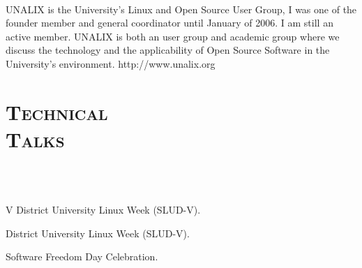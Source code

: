 \begin{resume}
\begin{formatb}
  \body\\
\end{formatb}

\begin{position}
UNALIX is the University's Linux and Open Source User Group, I was one
of the founder member  and general coordinator until January of
2006. I am still an active member. UNALIX is both an user group and academic group where we
discuss the technology and the applicability of Open Source Software
in the University's environment. http://www.unalix.org
\end{position}



\section{\textsc{Technical \\ Talks}}

\begin{formatb}
  \\
  \\
   \body
\end{formatb}

\begin{position}
V District University Linux Week (SLUD-V).
\end{position}

\begin{position}
District  University Linux Week (SLUD-V).
\end{position}

\begin{position}
Software Freedom Day Celebration.
\end{position}




\end{resume}
